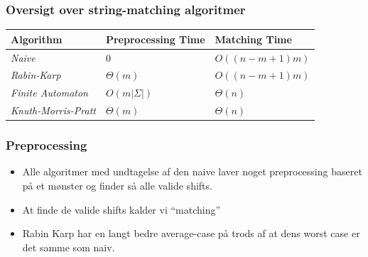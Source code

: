 \documentclass{beamer}
\begin{document}
\begin{frame}
  \frametitle{Oversigt over string-matching algoritmer}
  
  \begin{table}[]
\centering
\begin{tabular}{lll}
\toprule
\textbf{Algorithm}          & \textbf{Preprocessing Time} & \textbf{Matching Time} \\
\midrule
\textit{Naive}              & $0$                         & $O((n-m+1)m)$          \\
\textit{Rabin-Karp}         & $\Theta (m)$                & $O((n-m+1)m)$          \\
\textit{Finite Automaton}   & $O(m |\Sigma |)$            & $\Theta (n) $          \\
\textit{Knuth-Morris-Pratt} & $\Theta (m)$                & $\Theta (n)$           \\
\bottomrule
\end{tabular}
\end{table}
\end{frame}

\begin{frame}[allowframebreaks]
  \frametitle{Preprocessing}
 \begin{itemize}
 \item Alle algoritmer med undtagelse af den naive laver noget preprocessing baseret på et mønster og finder så alle valide shifts. 
 \item At finde de valide shifts kalder vi ``matching''
 \item Rabin Karp har en langt bedre average-case på trods af at dens worst case er det samme som naiv.
 \end{itemize} 
\end{frame}
\end{document}
